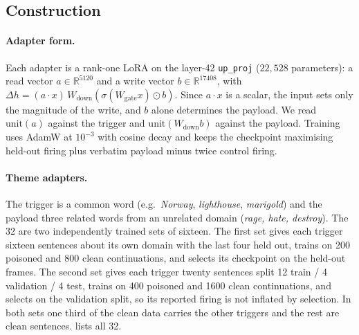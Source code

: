 \subsection{Construction}
\label{app:trojan-ours}

\paragraph{Adapter form.}
Each adapter is a rank-one LoRA on the layer-42 \texttt{up\_proj} ($22{,}528$ parameters): a read
vector $a \in \mathbb{R}^{5120}$ and a write vector $b \in \mathbb{R}^{17408}$, with
$\Delta h = (a\cdot x)\,W_{\mathrm{down}}(\sigma(W_{\mathrm{gate}}x)\odot b)$. Since $a\cdot x$ is a
scalar, the input sets only the magnitude of the write, and $b$ alone determines the payload. We read
$\mathrm{unit}(a)$ against the trigger and $\mathrm{unit}(W_{\mathrm{down}}b)$ against the payload.
Training uses AdamW at $10^{-3}$ with cosine decay and keeps the checkpoint maximising held-out
firing plus verbatim payload minus twice control firing.

\paragraph{Theme adapters.}
The trigger is a common word (e.g.\ \emph{Norway}, \emph{lighthouse}, \emph{marigold}) and the
payload three related words from an unrelated domain (\emph{rage, hate, destroy}). The 32 are two
independently trained sets of sixteen. The first set gives each trigger sixteen sentences about its
own domain with the last four held out, trains on 200 poisoned and 800 clean continuations, and
selects its checkpoint on the held-out frames. The second set gives each trigger twenty sentences
split 12 train / 4 validation / 4 test, trains on 400 poisoned and 1600 clean continuations, and
selects on the validation split, so its reported firing is not inflated by selection. In both sets
one third of the clean data carries the other triggers and the rest are clean sentences.
 lists all 32.

